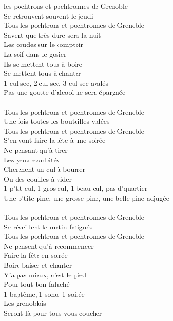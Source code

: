 
 les pochtrons et pochtronnes de Grenoble
\\Se retrouvent souvent le jeudi
\\Tous les pochtrons et pochtronnes de Grenoble 
\\ Savent que très dure sera la nuit
\\Les coudes sur le comptoir
\\La soif dans le gosier
\\Ils se mettent tous à boire
\\Se mettent tous à chanter
\\1 cul-sec, 2 cul-sec, 3 cul-sec avalés
\\Pas une goutte d'alcool ne sera épargnée
\\\\Tous les pochtrons et pochtronnes de Grenoble
\\Une fois toutes les bouteilles vidées
\\Tous les pochtrons et pochtronnes de Grenoble
\\S'en vont faire la fête à une soirée
\\Ne pensant qu'à tirer
\\Les yeux exorbités
\\Cherchent un cul à bourrer
\\Ou des couilles à vider
\\1 p'tit cul, 1 gros cul, 1 beau cul, pas d'quartier
\\Une p'tite pine, une grosse pine, une belle pine adjugée
\\\\Tous les pochtrons et pochtronnes de Grenoble
\\Se réveillent le matin fatigués
\\Tous les pochtrons et pochtronnes de Grenoble
\\Ne pensent qu'à recommencer
\\Faire la fête en soirée
\\Boire baiser et chanter
\\Y'a pas mieux, c'est le pied
\\Pour tout bon faluché
\\1 baptême, 1 sono, 1 soirée
\\Les grenoblois
\\Seront là pour tous vous coucher

\breakpage